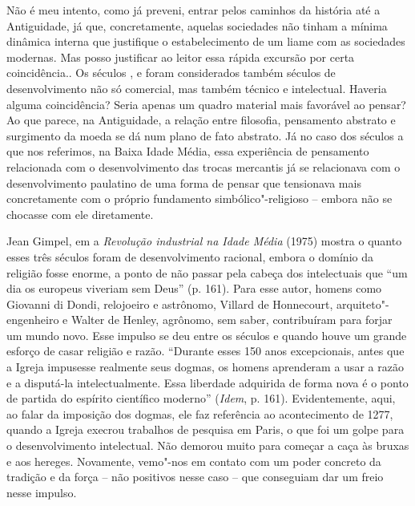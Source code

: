 Não é meu intento, como já preveni, entrar pelos caminhos da história
até a Antiguidade, já que, concretamente, aquelas sociedades não tinham
a mínima dinâmica interna que justifique o estabelecimento de um liame
com as sociedades modernas. Mas posso justificar ao leitor essa rápida
excursão por certa coincidência.. Os séculos ,
 e  foram considerados também
séculos de desenvolvimento não só comercial, mas também técnico e
intelectual. Haveria alguma coincidência? Seria apenas um quadro
material mais favorável ao pensar? Ao que parece, na Antiguidade, a
relação entre filosofia, pensamento abstrato e surgimento da moeda se dá
num plano de fato abstrato. Já no caso dos séculos a que nos referimos,
na Baixa Idade Média, essa experiência de pensamento relacionada com o
desenvolvimento das trocas mercantis já se relacionava com o
desenvolvimento paulatino de uma forma de pensar que tensionava mais
concretamente com o próprio fundamento simbólico"-religioso -- embora não
se chocasse com ele diretamente.

Jean Gimpel, em a \emph{Revolução industrial na Idade Média} (1975)
mostra o quanto esses três séculos foram de desenvolvimento racional,
embora o domínio da religião fosse enorme, a ponto de não passar pela
cabeça dos intelectuais que ``um dia os europeus viveriam sem Deus'' (p.
161). Para esse autor, homens como Giovanni di Dondi, relojoeiro e
astrônomo, Villard de Honnecourt, arquiteto"-engenheiro e Walter de
Henley, agrônomo, sem saber, contribuíram para forjar um mundo novo.
Esse impulso se deu entre os séculos  e  quando houve um grande
esforço de casar religião e razão. ``Durante esses 150 anos
excepcionais, antes que a Igreja impusesse realmente seus dogmas, os
homens aprenderam a usar a razão e a disputá-la intelectualmente. Essa
liberdade adquirida de forma nova é o ponto de partida do espírito
científico moderno'' (\emph{Idem}, p. 161). Evidentemente, aqui, ao
falar da imposição dos dogmas, ele faz referência ao acontecimento de
1277, quando a Igreja execrou trabalhos de pesquisa em Paris, o que foi
um golpe para o desenvolvimento intelectual. Não demorou muito para
começar a caça às bruxas e aos hereges. Novamente, vemo"-nos em contato
com um poder concreto da tradição e da força -- não positivos nesse caso
-- que conseguiam dar um freio nesse impulso.


